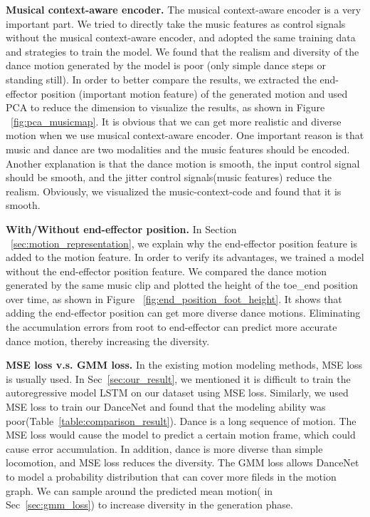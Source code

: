 \textbf{Musical context-aware encoder.}
The musical context-aware encoder is a very important part. We tried to directly take the music features as 
control signals without the musical context-aware encoder, 
and adopted the same training data and strategies to train the model. 
We found that the realism and diversity of the dance motion generated by the model is poor (only simple dance steps or standing still).
In order to better compare the results, 
we extracted the end-effector position (important motion feature) of the generated motion and 
used PCA to reduce the dimension
to visualize the results,  as shown in Figure ~\ref{fig:pca_musicmap}.
It is obvious that we can get more realistic and diverse motion when we use musical context-aware encoder. One important reason is that music and dance are two modalities and the music features should be encoded. Another explanation is that the dance motion is smooth, the input control signal should be smooth, and the jitter control signals(music features) reduce the realism. Obviously, we visualized the music-context-code and found that it is smooth.






\textbf{With/Without end-effector position.}
In Section ~\ref{sec:motion_representation}, we explain why the end-effector position feature is added to the motion feature.
 In order to verify its advantages, we trained a model without the end-effector position 
 feature. 
We compared the dance motion generated by the same music clip and plotted the height of 
 the toe\_end position over time, as shown in Figure ~\ref{fig:end_position_foot_height}.
It shows that adding the end-effector position can get more diverse dance motions. Eliminating the accumulation errors from root to end-effector can predict more accurate dance motion, thereby increasing the diversity.


\textbf{MSE loss v.s. GMM loss.} 
In the existing motion modeling methods\cite{li2017auto}\cite{lee2018interactive}, MSE loss is usually used. In Sec~\ref{sec:our_result}, we mentioned it is difficult to train the autoregressive model LSTM on our dataset using MSE loss. Similarly, we used MSE loss to train our DanceNet and found that the modeling ability was poor(Table~\ref{table:comparison_result}). Dance is a long sequence of motion. The MSE loss would cause the model to predict a certain motion frame, which could cause error accumulation. In addition, dance is more diverse than simple locomotion, and MSE loss reduces the diversity. The GMM loss allows DanceNet to model a probability distribution that can cover more fileds in the motion graph. We can sample around the predicted mean motion( in Sec~\ref{sec:gmm_loss}) to increase diversity in the generation phase.